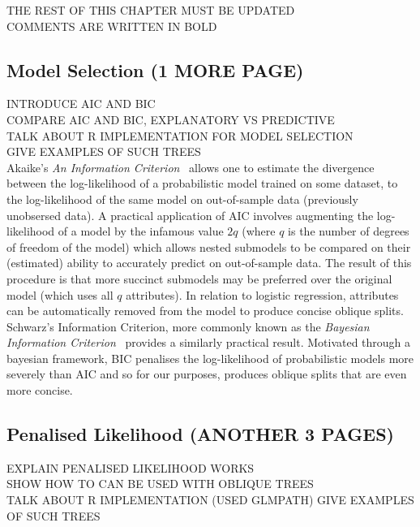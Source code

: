 \noindent THE REST OF THIS CHAPTER MUST BE UPDATED\\
\noindent COMMENTS ARE WRITTEN IN BOLD

\subsection{Model Selection (1 MORE PAGE)}
\label{ModelSelection}
\noindent INTRODUCE AIC AND BIC\\
\noindent COMPARE AIC AND BIC, EXPLANATORY VS PREDICTIVE\\
\noindent TALK ABOUT R IMPLEMENTATION FOR MODEL SELECTION\\
\noindent GIVE EXAMPLES OF SUCH TREES\\

Akaike's \emph{An Information Criterion}~\cite{citeulike:849862} allows one to estimate the divergence between the log-likelihood of a probabilistic model trained on some dataset, to the log-likelihood of the same model on out-of-sample data (previously unobsersed data). A practical application of AIC involves augmenting the log-likelihood of a model by the infamous value $2q$ (where $q$ is the number of degrees of freedom of the model) which allows nested submodels to be compared on their (estimated) ability to accurately predict on out-of-sample data. The result of this procedure is that more succinct submodels may be preferred over the original model (which uses all $q$ attributes). In relation to logistic regression, attributes can be automatically removed from the model to produce concise oblique splits. \\

Schwarz's Information Criterion, more commonly known as the \emph{Bayesian Information Criterion}~\cite{citeulike:90008} provides a similarly practical result. Motivated through a bayesian framework, BIC penalises the log-likelihood of probabilistic models more severely than AIC and so for our purposes, produces oblique splits that are even more concise.\\


\subsection{Penalised Likelihood (ANOTHER 3 PAGES)}
\label{PenalisedLikelihood}
\noindent EXPLAIN PENALISED LIKELIHOOD WORKS\\
\noindent SHOW HOW TO CAN BE USED WITH OBLIQUE TREES\\
\noindent TALK ABOUT R IMPLEMENTATION (USED GLMPATH) 
\noindent GIVE EXAMPLES OF SUCH TREES

